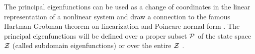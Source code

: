\documentclass[11pt]{article}
\theoremstyle{plain}
\newcommand{\cZ}{{\cal Z}}
\newcommand{\cP}{{\cal P}}
\newcommand{\mU}{{\mathbb U}}
\newcommand{\bF}{{\mathbf F}}
\begin{document}
The principal eigenfunctions can be used as a change of coordinates in the linear representation of a nonlinear system and draw a connection to the famous Hartman-Grobman theorem  on linearization and Poincare normal form \cite{arnold2012geometrical}. 
The principal eigenfunctions will be defined over a proper subset $\cP$ of the state space $\cZ$ (called subdomain eigenfunctions) or over the entire $\cZ$ \cite[Lemma 5.1, Corollary 5.1, 5.2, and 5.8]{mezic2020spectrum}. \\
\end{document}
